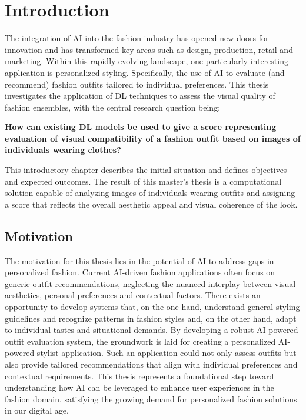 \chapter{Introduction}

The integration of \ac{AI} into the fashion industry has opened new doors for innovation and has transformed key areas such as design, production, retail and marketing. Within this rapidly evolving landscape, one particularly interesting application is personalized styling. Specifically, the use of \acs{AI} to evaluate (and recommend) fashion outfits tailored to individual preferences. This thesis investigates the application of \ac{DL} techniques to assess the visual quality of fashion ensembles, with the central research question being:

\begin{displayquote}
\textbf{How can existing \acs{DL} models be used to give a score representing evaluation of visual compatibility of a fashion outfit based on images of individuals wearing clothes?}
\end{displayquote}

This introductory chapter describes the initial situation and defines objectives and expected outcomes. The result of this master's thesis is a computational solution capable of analyzing images of individuals wearing outfits and assigning a score that reflects the overall aesthetic appeal and visual coherence of the look.

\section{Motivation}

The motivation for this thesis lies in the potential of \acs{AI} to address gaps in personalized fashion. Current \acs{AI}-driven fashion applications often focus on generic outfit recommendations, neglecting the nuanced interplay between visual aesthetics, personal preferences and contextual factors. There exists an opportunity to develop systems that, on the one hand, understand general styling guidelines and recognize patterns in fashion styles and, on the other hand, adapt to individual tastes and situational demands. By developing a robust \acs{AI}-powered outfit evaluation system, the groundwork is laid for creating a personalized \acs{AI}-powered stylist application. Such an application could not only assess outfits but also provide tailored recommendations that align with individual preferences and contextual requirements. This thesis represents a foundational step toward understanding how \acs{AI} can be leveraged to enhance user experiences in the fashion domain, satisfying the growing demand for personalized fashion solutions in our digital age.

